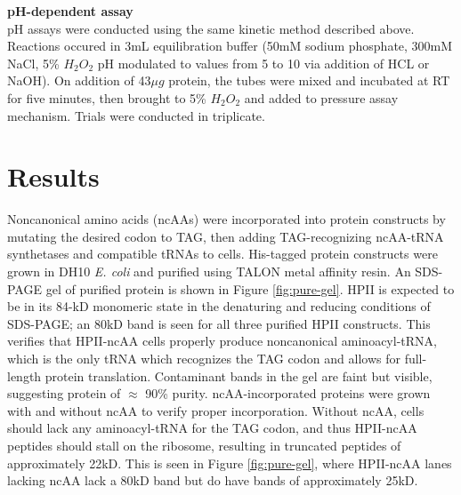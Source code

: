\documentclass[journal=jacsat,manuscript=article]{achemso}
\begin{document}
\textbf{pH-dependent assay}\\
pH assays were conducted using the same kinetic method described above. Reactions occured in 3mL equilibration buffer (50mM sodium phosphate, 300mM NaCl, 5\% $H_2O_2$ pH modulated to values from 5 to 10 via addition of HCL or NaOH). On addition of 43$\mu g$ protein, the tubes were mixed and incubated at RT for five minutes, then brought to 5\% $H_2O_2$ and added to pressure assay mechanism. Trials were conducted in triplicate.\\

\section{Results}
Noncanonical amino acids (ncAAs) were incorporated into protein constructs by mutating the desired codon to TAG, then adding TAG-recognizing ncAA-tRNA synthetases and compatible tRNAs to cells. His-tagged protein constructs were grown in DH10 \textit{E. coli} and purified using TALON metal affinity resin. An SDS-PAGE gel of purified protein is shown in Figure \ref{fig:pure-gel}. HPII is expected to be in its 84-kD monomeric state in the denaturing and reducing conditions of SDS-PAGE; an 80kD band is seen for all three purified HPII constructs. This verifies that HPII-ncAA cells properly produce noncanonical aminoacyl-tRNA, which is the only tRNA which recognizes the TAG codon and allows for full-length protein translation. Contaminant bands in the gel are faint but visible, suggesting protein of $\approx$ 90\% purity. ncAA-incorporated proteins were grown with and without ncAA to verify proper incorporation. Without ncAA, cells should lack any aminoacyl-tRNA for the TAG codon, and thus HPII-ncAA peptides should stall on the ribosome, resulting in truncated peptides of approximately 22kD. This is seen in Figure \ref{fig:pure-gel}, where HPII-ncAA lanes lacking ncAA lack a 80kD band but do have bands of approximately 25kD.\\
\end{document}

